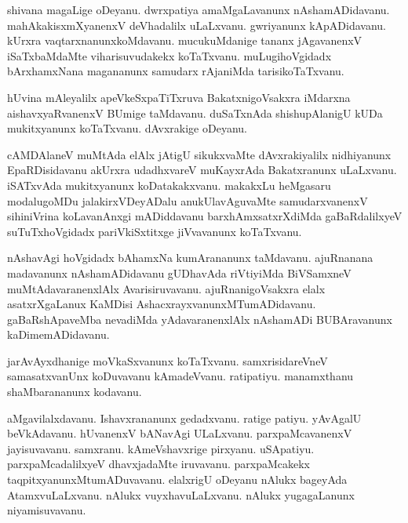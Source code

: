 \documentclass{article}
\begin{document}
\begin{mn}%
shivana magaLige oDeyanu. dwrxpatiya amaMgaLavanunx nAshamADidavanu. mahAkakisxmXyanenxV 
deVhadalilx uLaLxvanu. gwriyanunx kApADidavanu. kUrxra vaqtarxnanunxkoMdavanu. mucukuMdanige 
tananx jAgavanenxV iSaTxbaMdaMte viharisuvudakekx koTaTxvanu. muLugihoVgidadx bArxhamxNana 
magananunx samudarx rAjaniMda tarisikoTaTxvanu.
\end{mn}

\begin{mn}%
hUvina mAleyalilx apeVkeSxpaTiTxruva BakatxnigoVsakxra iMdarxna aishavxyaRvanenxV BUmige taMdavanu. 
duSaTxnAda shishupAlanigU kUDa mukitxyanunx koTaTxvanu. dAvxrakige oDeyanu.
\end{mn}

\begin{mn}%
cAMDAlaneV muMtAda elAlx jAtigU sikukxvaMte dAvxrakiyalilx nidhiyanunx EpaRDisidavanu akUrxra 
udadhxvareV muKayxrAda Bakatxranunx uLaLxvanu. iSATxvAda mukitxyanunx koDatakakxvanu. makakxLu 
heMgasaru modalugoMDu jalakirxVDeyADalu anukUlavAguvaMte samudarxvanenxV sihiniVrina koLavanAnxgi 
mADiddavanu barxhAmxsatxrXdiMda gaBaRdalilxyeV suTuTxhoVgidadx pariVkiSxtitxge jiVvavanunx 
koTaTxvanu.
\end{mn}

\begin{mn}%
nAshavAgi hoVgidadx bAhamxNa kumArananunx taMdavanu. ajuRnanana madavanunx nAshamADidavanu 
gUDhavAda riVtiyiMda BiVSamxneV muMtAdavaranenxlAlx Avarisiruvavanu. ajuRnanigoVsakxra elalx 
asatxrXgaLanux KaMDisi AshacxrayxvanunxMTumADidavanu. gaBaRshApaveMba nevadiMda yAdavaranenxlAlx 
nAshamADi BUBAravanunx kaDimemADidavanu.
\end{mn}

\begin{mn}%
jarAvAyxdhanige moVkaSxvanunx koTaTxvanu. samxrisidareVneV samasatxvanUnx koDuvavanu kAmadeVvanu. 
ratipatiyu. manamxthanu shaMbarananunx kodavanu.
\end{mn}

\begin{mn}%
aMgavilalxdavanu. Ishavxrananunx gedadxvanu. ratige patiyu. yAvAgalU beVkAdavanu. hUvanenxV 
bANavAgi ULaLxvanu. parxpaMcavanenxV jayisuvavanu. samxranu. kAmeVshavxrige pirxyanu. uSApatiyu. 
parxpaMcadalilxyeV dhavxjadaMte iruvavanu. parxpaMcakekx taqpitxyanunxMtumADuvavanu. elalxrigU 
oDeyanu nAlukx bageyAda AtamxvuLaLxvanu. nAlukx vuyxhavuLaLxvanu. nAlukx yugagaLanunx 
niyamisuvavanu.
\end{mn}
\end{document}
